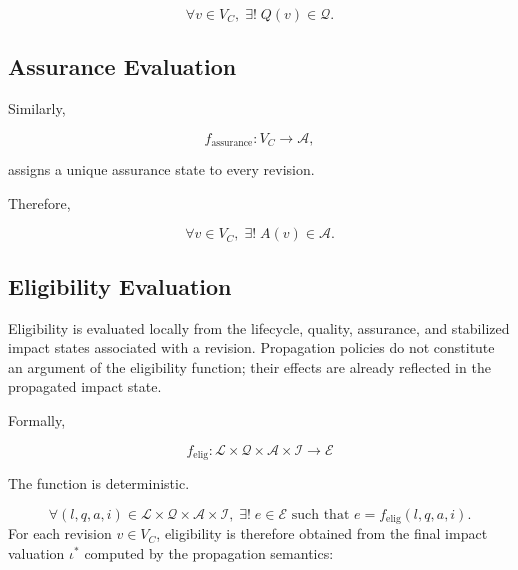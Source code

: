 \documentclass[10pt]{article}
\begin{document}
\begin{equation}
	\forall v\in V_C,\;
	\exists!\;
	Q(v)\in\mathcal{Q}.
	\label{eq:quality_total}
\end{equation}

\subsection{Assurance Evaluation}

Similarly,

\begin{equation}
	f_{\mathrm{assurance}} : V_C \rightarrow \mathcal A,
	\label{eq:assurance_function}
\end{equation}

assigns a unique assurance state to every revision.

Therefore,

\begin{equation}
	\forall v\in V_C,\;
	\exists!\;
	A(v)\in\mathcal{A}.
	\label{eq:assurance_total}
\end{equation}

\subsection{Eligibility Evaluation}

Eligibility is evaluated locally from the lifecycle, quality, assurance, and stabilized impact states associated with a revision. Propagation policies do not constitute an argument of the eligibility function; their effects are already reflected in the propagated impact state.

Formally,

\begin{equation}
	f_{\mathrm{elig}}
	:
	\mathcal{L}
	\times
	\mathcal{Q}
	\times
	\mathcal{A}
	\times
	\mathcal{I}
	\rightarrow
	\mathcal{E}
	\label{eq:eligibility_function_formal}
\end{equation}

The function is deterministic.

\begin{equation}
	\forall
	(l,q,a,i)
	\in
	\mathcal{L}
	\times
	\mathcal{Q}
	\times
	\mathcal{A}
	\times
	\mathcal{I},
	\;
	\exists!\;
	e
	\in
	\mathcal{E}
	\text{ such that }
	e
	=
	f_{\mathrm{elig}}(l,q,a,i).
	\label{eq:eligibility_deterministic}
\end{equation}
For each revision $v\in V_C$, eligibility is therefore obtained from the final
impact valuation $\iota^{*}$ computed by the propagation semantics:
\end{document}
